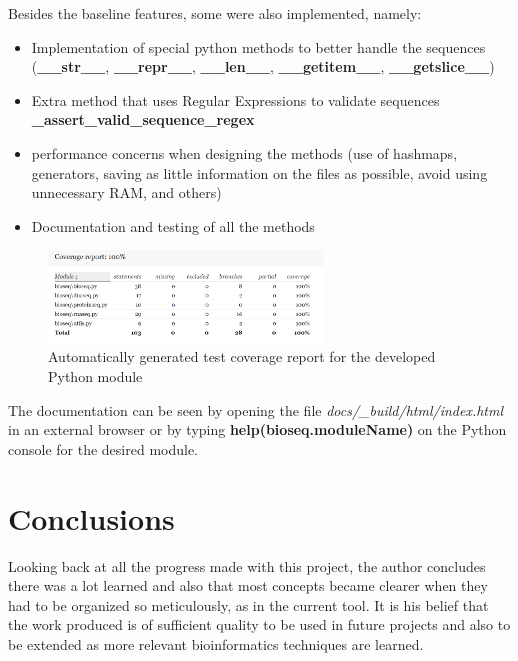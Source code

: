 \documentclass[11pt]{article}
\begin{document}
Besides the baseline features, some were also implemented, namely:
\begin{itemize}
    \itemsep0em 
    \item Implementation of special python methods to better handle the sequences (\textbf{\_\_str\_\_}, \textbf{\_\_repr\_\_}, \textbf{\_\_len\_\_}, \textbf{\_\_getitem\_\_}, \textbf{\_\_getslice\_\_})
    \item Extra method that uses Regular Expressions to validate sequences \textbf{\_assert\_valid\_sequence\_regex}
    \item performance concerns when designing the methods (use of hashmaps, generators, saving as little information on the files as possible, avoid using unnecessary RAM, and others)
    \item Documentation and testing of all the methods
\end{itemize}
\begin{figure}[h!]
    \centering
    \includegraphics[width=0.65\textwidth]{coverageReport.png}
    \caption{Automatically generated test coverage report for the developed Python module}
    \label{fig:coverageReport}
\end{figure}

The documentation can be seen by opening the file \textit{docs/\_build/html/index.html} in an external browser or by typing \textbf{help(bioseq.moduleName)} on the Python console for the desired module. 


\section{Conclusions}
Looking back at all the progress made with this project, the author concludes there was a lot learned and also that most concepts became clearer when they had to be organized so meticulously, as in the current tool. It is his belief that the work produced is of sufficient quality to be used in future projects and also to be extended as more relevant bioinformatics techniques are learned.
\end{document}
